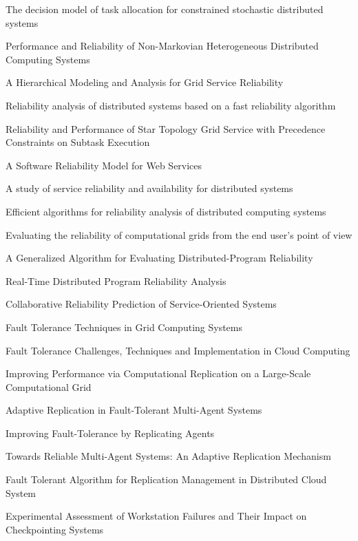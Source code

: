 \documentclass{cslthse-msc}
\begin{document}
\begin{thebibliography}{50}
The decision model of task allocation for constrained stochastic distributed systems

Performance and Reliability of Non-Markovian Heterogeneous Distributed Computing Systems

A Hierarchical Modeling and Analysis for Grid Service Reliability

Reliability analysis of distributed systems based on a fast reliability algorithm

Reliability and Performance of Star Topology Grid Service with Precedence Constraints on Subtask Execution

A Software Reliability Model for Web Services

A study of service reliability and availability for distributed systems

Efficient algorithms for reliability analysis of distributed computing systems

Evaluating the reliability of computational grids from the end user’s point of view

A Generalized Algorithm for Evaluating Distributed-Program Reliability

Real-Time Distributed Program Reliability Analysis

Collaborative Reliability Prediction of Service-Oriented Systems

Fault Tolerance Techniques in Grid Computing Systems

Fault Tolerance Challenges, Techniques and Implementation in Cloud Computing

Improving Performance via Computational Replication on a Large-Scale Computational Grid

Adaptive Replication in Fault-Tolerant Multi-Agent Systems

Improving Fault-Tolerance by Replicating Agents

Towards Reliable Multi-Agent Systems: An Adaptive Replication Mechanism

Fault Tolerant Algorithm for Replication Management in Distributed Cloud System

Experimental Assessment of Workstation Failures and Their Impact on Checkpointing Systems

\end{thebibliography}
\end{document}
